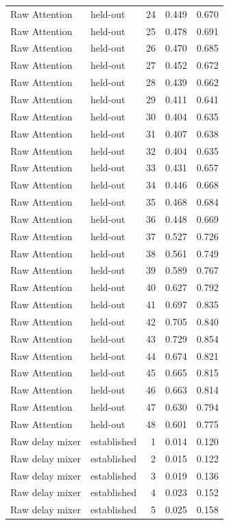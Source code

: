 \begin{tabular}{llrrr}
Raw Attention & held-out & 24 & 0.449 & 0.670 \\
Raw Attention & held-out & 25 & 0.478 & 0.691 \\
Raw Attention & held-out & 26 & 0.470 & 0.685 \\
Raw Attention & held-out & 27 & 0.452 & 0.672 \\
Raw Attention & held-out & 28 & 0.439 & 0.662 \\
Raw Attention & held-out & 29 & 0.411 & 0.641 \\
Raw Attention & held-out & 30 & 0.404 & 0.635 \\
Raw Attention & held-out & 31 & 0.407 & 0.638 \\
Raw Attention & held-out & 32 & 0.404 & 0.635 \\
Raw Attention & held-out & 33 & 0.431 & 0.657 \\
Raw Attention & held-out & 34 & 0.446 & 0.668 \\
Raw Attention & held-out & 35 & 0.468 & 0.684 \\
Raw Attention & held-out & 36 & 0.448 & 0.669 \\
Raw Attention & held-out & 37 & 0.527 & 0.726 \\
Raw Attention & held-out & 38 & 0.561 & 0.749 \\
Raw Attention & held-out & 39 & 0.589 & 0.767 \\
Raw Attention & held-out & 40 & 0.627 & 0.792 \\
Raw Attention & held-out & 41 & 0.697 & 0.835 \\
Raw Attention & held-out & 42 & 0.705 & 0.840 \\
Raw Attention & held-out & 43 & 0.729 & 0.854 \\
Raw Attention & held-out & 44 & 0.674 & 0.821 \\
Raw Attention & held-out & 45 & 0.665 & 0.815 \\
Raw Attention & held-out & 46 & 0.663 & 0.814 \\
Raw Attention & held-out & 47 & 0.630 & 0.794 \\
Raw Attention & held-out & 48 & 0.601 & 0.775 \\
Raw delay mixer & established & 1 & 0.014 & 0.120 \\
Raw delay mixer & established & 2 & 0.015 & 0.122 \\
Raw delay mixer & established & 3 & 0.019 & 0.136 \\
Raw delay mixer & established & 4 & 0.023 & 0.152 \\
Raw delay mixer & established & 5 & 0.025 & 0.158 \\

\end{tabular}
